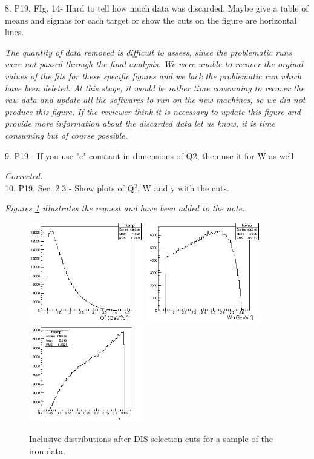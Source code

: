 \documentclass[12pt]{article}
\begin{document}
8.
P19, FIg. 14- Hard to tell how much data was discarded. Maybe give a table of means and 
sigmas for each target or show the cuts on the figure are horizontal lines.

{\it The quantity of data removed is difficult to assess, since the problematic runs were
not passed through the final analysis. We were unable to recover the orginal values of the
fits for these specific figures and we 
lack the problematic run which have been deleted. At this stage, it would be rather time
consuming to recover the raw data and update all the softwares to run on the new machines, so 
we did not produce this figure. If the reviewer think it is necessary to update this 
figure and provide more information about the discarded data let us know, it is time 
consuming but of course possible.}

9.
P19 - If you use "c" constant in dimensions of Q2, then use it for W as well.

{\it Corrected.} \\

10.
P19, Sec. 2.3 - Show plots of Q$^2$, W and y with the cuts.

{\it Figures \ref{DISKine} illustrates the request and have been added to the note.} \\

\begin{figure}[tbp]
\centering
\includegraphics[width=5cm] {answer-fig/DIS-Q2.png} 
\includegraphics[width=5cm] {answer-fig/DIS-w.png} 
\includegraphics[width=5cm] {answer-fig/DIS-y.png} 
\caption {Inclusive distributions after DIS selection cuts for a sample of the iron
data.}
\label{DISKine}
\end{figure}
\end{document}
